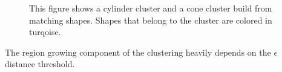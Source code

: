 \begin{figure}
\centering
{}
	\caption{This figure shows a cylinder cluster and a cone cluster build from matching shapes. Shapes that belong to the cluster are colored in turqoise.}
	\label{fig:regionGrowingConeCylinder}
\end{figure}


The region growing component of the clustering heavily depends on the $\epsilon$ distance threshold. 
